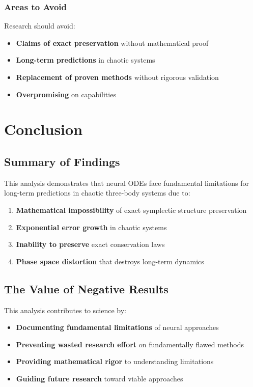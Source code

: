 \documentclass[11pt,a4paper]{article}
\begin{document}
\subsubsection{Areas to Avoid}

Research should avoid:
\begin{itemize}
    \item \textbf{Claims of exact preservation} without mathematical proof
    \item \textbf{Long-term predictions} in chaotic systems
    \item \textbf{Replacement of proven methods} without rigorous validation
    \item \textbf{Overpromising} on capabilities
\end{itemize}

\section{Conclusion}

\subsection{Summary of Findings}

This analysis demonstrates that neural ODEs face fundamental limitations for long-term predictions in chaotic three-body systems due to:

\begin{enumerate}
    \item \textbf{Mathematical impossibility} of exact symplectic structure preservation
    \item \textbf{Exponential error growth} in chaotic systems
    \item \textbf{Inability to preserve} exact conservation laws
    \item \textbf{Phase space distortion} that destroys long-term dynamics
\end{enumerate}

\subsection{The Value of Negative Results}

This analysis contributes to science by:
\begin{itemize}
    \item \textbf{Documenting fundamental limitations} of neural approaches
    \item \textbf{Preventing wasted research effort} on fundamentally flawed methods
    \item \textbf{Providing mathematical rigor} to understanding limitations
    \item \textbf{Guiding future research} toward viable approaches
\end{itemize}
\end{document}
